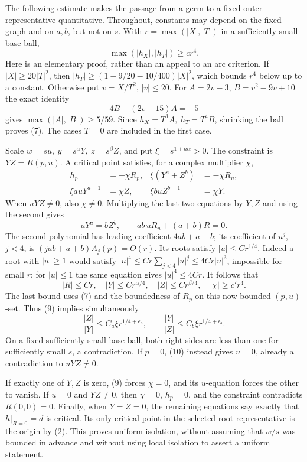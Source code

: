 \documentclass[11pt]{article}
\begin{document}
The following estimate makes the passage from a germ to a fixed
outer representative quantitative. Throughout, constants may depend
on the fixed graph and on \(a,b\), but not on \(s\).
With \(r=\max(|X|,|T|)\) in a sufficiently small base ball,
\[
             \max(|h_X|,|h_T|)\ge c r^4.           \tag{7}
\]
Here is an elementary proof, rather than an appeal to an arc criterion.
If \(|X|\ge20|T|^2\), then
\(|h_T|\ge(1-9/20-10/400)|X|^2\), which bounds \(r^4\)
below up to a constant. Otherwise put \(v=X/T^2\), \(|v|\le20\).
For \(A=2v-3\), \(B=v^2-9v+10\) the exact identity
\[
                  4B-(2v-15)A=-5                  \tag{8}
\]
gives \(\max(|A|,|B|)\ge5/59\). Since
\(h_X=T^3A,\ h_T=T^4B\), shrinking the ball proves (7).
The cases \(T=0\) are included in the first case.

Scale \(w=su,\ y=s^\alpha Y,\ z=s^\beta Z\), and put
\(\xi=s^{1+a\alpha}>0\). The constraint is \(YZ=R(p,u)\).
A critical point satisfies, for a complex multiplier \(\chi\),
\[
\begin{aligned}
 h_p&=-\chi R_p,&\xi(Y^a+Z^b)&=-\chi R_u,\\
 \xi a uY^{a-1}&=\chi Z,&
 \xi b uZ^{b-1}&=\chi Y.
\end{aligned}                                      \tag{9}
\]
When \(uYZ\ne0\), also \(\chi\ne0\). Multiplying the last two
equations by \(Y,Z\) and using the second gives
\[
 aY^a=bZ^b,\qquad
 ab\,uR_u+(a+b)R=0.                                \tag{10}
\]
The second polynomial has leading coefficient \(4ab+a+b\);
its coefficient of \(u^j\), \(j<4\), is
\((jab+a+b)A_j(p)=O(r)\).
Its roots satisfy \(|u|\le C r^{1/4}\).
Indeed a root with \(|u|\ge1\) would satisfy
\(|u|^4\le C r\sum_{j<4}|u|^j\le4Cr|u|^3\),
impossible for small \(r\); for \(|u|\le1\) the same equation
gives \(|u|^4\le4Cr\).
It follows that
\[
 |R|\le C r,\quad |Y|\le C r^{\alpha/4},\quad
 |Z|\le C r^{\beta/4},\quad |\chi|\ge c' r^4.        \tag{11}
\]
The last bound uses (7) and the boundedness of \(R_p\) on this
now bounded \((p,u)\)-set. Thus (9) implies simultaneously
\[
 \frac{|Z|}{|Y|}\le C_a\xi r^{1/4+\epsilon_a},\qquad
 \frac{|Y|}{|Z|}\le C_b\xi r^{1/4+\epsilon_b}.       \tag{12}
\]
On a fixed sufficiently small base ball, both right sides are
less than one for sufficiently small \(s\), a contradiction.
If \(p=0\), (10) instead gives \(u=0\), already a contradiction
to \(uYZ\ne0\).

If exactly one of \(Y,Z\) is zero, (9) forces \(\chi=0\),
and its \(u\)-equation forces the other to vanish.
If \(u=0\) and \(YZ\ne0\), then \(\chi=0\), \(h_p=0\), and
the constraint contradicts \(R(0,0)=0\).
Finally, when \(Y=Z=0\), the remaining equations say exactly that
\(h|_{R=0}=d\) is critical. Its only critical point in the selected
root representative is the origin by (2).
This proves uniform isolation, without assuming that \(w/s\)
was bounded in advance and without using local isolation to
assert a uniform statement.
\end{document}
